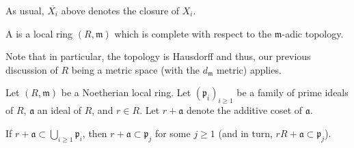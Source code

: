 As usual, $\overline{X_{i}}$ above denotes the closure of $X_{i}$.

\begin{defn}
	A  is a local ring $(R, \mathfrak{m})$ which is complete with respect to the $\mathfrak{m}$-adic topology.
\end{defn}
Note that in particular, the topology is Hausdorff and thus, our previous discussion of $R$ being a metric space (with the $d_{\mathfrak{m}}$ metric) applies.

\begin{thm}
	Let $(R, \mathfrak{m})$ be a Noetherian local ring. Let $(\mathfrak{p}_{i})_{i \ge 1}$ be a family of prime ideals of $R$, $\mathfrak{a}$ an ideal of $R$, and $r \in R$. Let $r + \mathfrak{a}$ denote the additive coset of $\mathfrak{a}$.

	If $r + \mathfrak{a} \subset \bigcup_{i \ge 1} \mathfrak{p}_{i}$, then $r + \mathfrak{a} \subset \mathfrak{p}_{j}$ for some $j \ge 1$ (and in turn, $rR + \mathfrak{a} \subset \mathfrak{p}_{j}$).
\end{thm}
